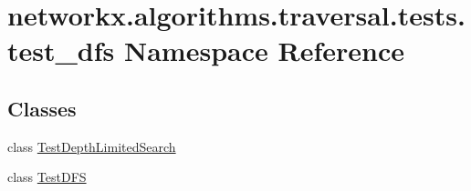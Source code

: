 \hypertarget{namespacenetworkx_1_1algorithms_1_1traversal_1_1tests_1_1test__dfs}{}\section{networkx.\+algorithms.\+traversal.\+tests.\+test\+\_\+dfs Namespace Reference}
\label{namespacenetworkx_1_1algorithms_1_1traversal_1_1tests_1_1test__dfs}
\subsection*{Classes}
\begin{DoxyCompactItemize}
\item 
class \hyperlink{classnetworkx_1_1algorithms_1_1traversal_1_1tests_1_1test__dfs_1_1TestDepthLimitedSearch}{Test\+Depth\+Limited\+Search}
\item 
class \hyperlink{classnetworkx_1_1algorithms_1_1traversal_1_1tests_1_1test__dfs_1_1TestDFS}{Test\+D\+FS}
\end{DoxyCompactItemize}
